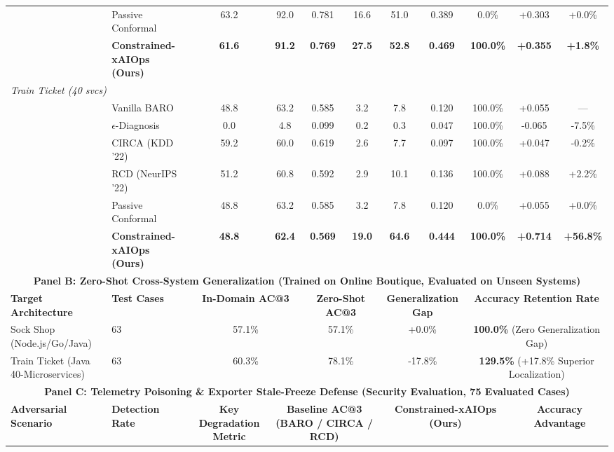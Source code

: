 \begin{table}[t]
{\begin{tabular}{ll|ccc|ccc|ccc}
 & Passive Conformal & 63.2 & 92.0 & 0.781 & 16.6 & 51.0 & 0.389 & 0.0\% & +0.303 & +0.0\% \\
 & \textbf{Constrained-xAIOps (Ours)} & \textbf{61.6} & \textbf{91.2} & \textbf{0.769} & \textbf{27.5} & \textbf{52.8} & \textbf{0.469} & \textbf{100.0\%} & \textbf{+0.355} & \textbf{+1.8\%} \\
\hline
\multicolumn{11}{l}{\textit{Train Ticket (40 svcs)}} \\
 & Vanilla BARO & 48.8 & 63.2 & 0.585 & 3.2 & 7.8 & 0.120 & 100.0\% & +0.055 & --- \\
 & $\epsilon$-Diagnosis & 0.0 & 4.8 & 0.099 & 0.2 & 0.3 & 0.047 & 100.0\% & -0.065 & -7.5\% \\
 & CIRCA (KDD '22) & 59.2 & 60.0 & 0.619 & 2.6 & 7.7 & 0.097 & 100.0\% & +0.047 & -0.2\% \\
 & RCD (NeurIPS '22) & 51.2 & 60.8 & 0.592 & 2.9 & 10.1 & 0.136 & 100.0\% & +0.088 & +2.2\% \\
 & Passive Conformal & 48.8 & 63.2 & 0.585 & 3.2 & 7.8 & 0.120 & 0.0\% & +0.055 & +0.0\% \\
 & \textbf{Constrained-xAIOps (Ours)} & \textbf{48.8} & \textbf{62.4} & \textbf{0.569} & \textbf{19.0} & \textbf{64.6} & \textbf{0.444} & \textbf{100.0\%} & \textbf{+0.714} & \textbf{+56.8\%} \\
\hline
\multicolumn{11}{c}{\textbf{Panel B: Zero-Shot Cross-System Generalization (Trained on Online Boutique, Evaluated on Unseen Systems)}} \\
\hline
\textbf{Target Architecture} & \textbf{Test Cases} & \multicolumn{2}{c}{\textbf{In-Domain AC@3}} & \multicolumn{2}{c}{\textbf{Zero-Shot AC@3}} & \multicolumn{2}{c|}{\textbf{Generalization Gap}} & \multicolumn{3}{c}{\textbf{Accuracy Retention Rate}} \\
\hline
Sock Shop (Node.js/Go/Java) & 63 & \multicolumn{2}{c}{57.1\%} & \multicolumn{2}{c}{57.1\%} & \multicolumn{2}{c|}{+0.0\%} & \multicolumn{3}{c}{\textbf{100.0\%} (Zero Generalization Gap)} \\
Train Ticket (Java 40-Microservices) & 63 & \multicolumn{2}{c}{60.3\%} & \multicolumn{2}{c}{78.1\%} & \multicolumn{2}{c|}{-17.8\%} & \multicolumn{3}{c}{\textbf{129.5\%} (+17.8\% Superior Localization)} \\
\hline
\multicolumn{11}{c}{\textbf{Panel C: Telemetry Poisoning \& Exporter Stale-Freeze Defense (Security Evaluation, 75 Evaluated Cases)}} \\
\hline
\textbf{Adversarial Scenario} & \textbf{Detection Rate} & \textbf{Key Degradation Metric} & \multicolumn{3}{c|}{\textbf{Baseline AC@3 (BARO / CIRCA / RCD)}} & \multicolumn{3}{c|}{\textbf{Constrained-xAIOps (Ours)}} & \multicolumn{2}{c}{\textbf{Accuracy Advantage}} \\

\end{tabular}}
\end{table}
